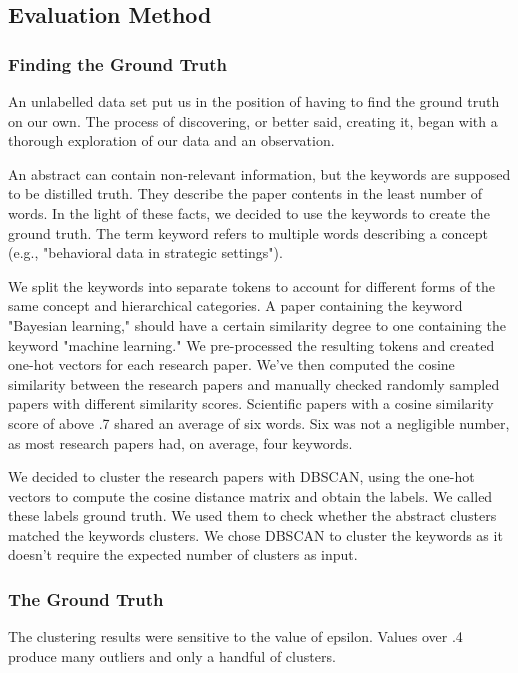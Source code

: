 \subsection{Evaluation Method}
\subsubsection{Finding the Ground Truth}
An unlabelled data set put us in the position of having to find the ground truth on our own. The process of discovering, or better said, creating it, began with a thorough exploration of our data and an observation. 


An abstract can contain non-relevant information, but the keywords are supposed to be distilled truth. They describe the paper contents in the least number of words. In the light of these facts, we decided to use the keywords to create the ground truth. The term keyword refers to multiple words describing a concept (e.g., "behavioral data in strategic settings"). 

We split the keywords into separate tokens to account for different forms of the same concept and hierarchical categories. A paper containing the keyword "Bayesian learning," should have a certain similarity degree to one containing the keyword "machine learning." We pre-processed the resulting tokens and created one-hot vectors for each research paper. We've then computed the cosine similarity between the research papers and manually checked randomly sampled papers with different similarity scores. Scientific papers with a cosine similarity score of above .7 shared an average of six words. Six was not a negligible number, as most research papers had, on average, four keywords. 

We decided to cluster the research papers with DBSCAN, using the one-hot vectors to compute the cosine distance matrix and obtain the labels. We called these labels ground truth. We used them to check whether the abstract clusters matched the keywords clusters.
We chose DBSCAN to cluster the keywords as it doesn't require the expected number of clusters as input. 

\subsubsection{The Ground Truth}
The clustering results were sensitive to the value of epsilon. Values over .4 produce many outliers and only a handful of clusters. 